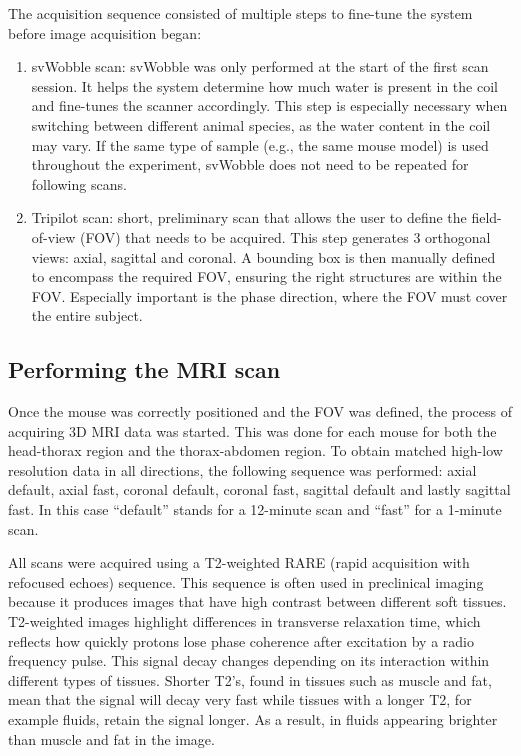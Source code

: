 \documentclass[twocolumn]{article}
\begin{document}
The acquisition sequence consisted of multiple steps to fine-tune the system before image acquisition began: 

\begin{enumerate}
\item svWobble scan: svWobble was only performed at the start of the first scan session. It helps the system determine how much water is present in the coil and fine-tunes the scanner accordingly. 
This step is especially necessary when switching between different animal species, as the water content in the coil may vary. 
If the same type of sample (e.g., the same mouse model) is used throughout the experiment, svWobble does not need to be repeated for following scans.
\item Tripilot scan:  short, preliminary scan that allows the user to define the field-of-view (FOV) that needs to be acquired. 
This step generates 3 orthogonal views: axial, sagittal and coronal. A bounding box is then manually defined to encompass the required FOV, ensuring the right structures are within the FOV. 
Especially important is the phase direction, where the FOV must cover the entire subject.
\end{enumerate}

\subsection{Performing the MRI scan}

Once the mouse was correctly positioned and the FOV was defined, the process of acquiring 3D MRI data was started. 
This was done for each mouse for both the head-thorax region and the thorax-abdomen region. 
To obtain matched high-low resolution data in all directions, the following sequence was performed: axial default, axial fast, coronal default, coronal fast, sagittal default and lastly sagittal fast. 
In this case ``default'' stands for a 12-minute scan and ``fast'' for a 1-minute scan.

All scans were acquired using a T2-weighted RARE (rapid acquisition with refocused echoes) sequence. 
This sequence is often used in preclinical imaging because it produces images that have high contrast between different soft tissues. 
T2-weighted images highlight  differences in transverse relaxation time, which reflects how quickly protons lose phase coherence after excitation by a radio frequency pulse. 
This signal decay changes depending on its interaction within different types of tissues. 
Shorter T2's, found in tissues such as muscle and fat, mean that the signal will decay very fast while tissues with a longer T2, for example fluids, retain the signal longer. 
As a result, in fluids appearing brighter than muscle and fat in the image. 
\end{document}
